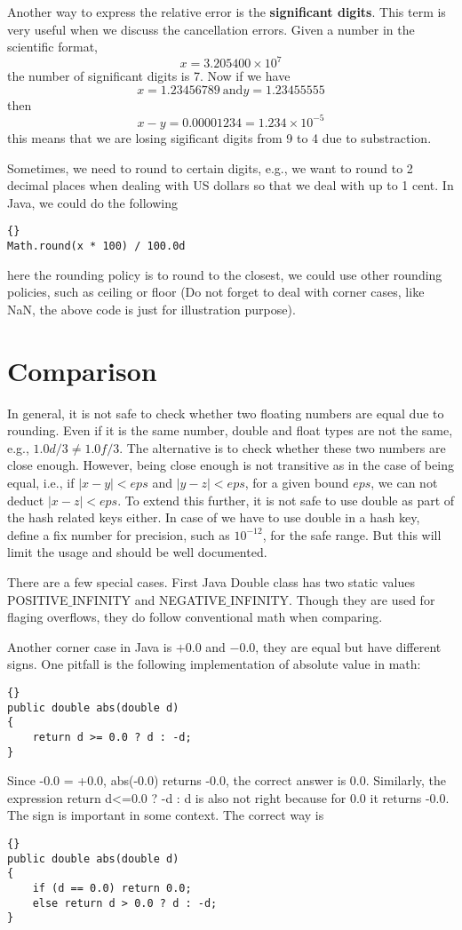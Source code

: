 Another way to express the relative error is the \textbf{significant digits}. This term is very useful when we discuss the cancellation errors. Given a number in the scientific format,
\[ x = 3.205400 \times 10^7 \]
the number of significant digits is 7. Now if we have
\[ x = 1.23456789 \ \text{and} y = 1.23455555\]
then
\[ x - y = 0.00001234 = 1.234 \times 10^{-5} \]
this means that we are losing sigificant digits from 9 to 4 due to substraction. 

Sometimes, we need to round to certain digits, e.g., we want to round to 2 decimal places when dealing with US dollars so that we deal with up to 1 cent.
In Java, we could do the following
\begin{lstlisting}[frame=trbl]{}
Math.round(x * 100) / 100.0d
\end{lstlisting}
here the rounding policy is to round to the closest, we could use other rounding policies, such as ceiling or floor (Do not forget to deal with corner cases, like NaN, the above code is just for illustration purpose).

\section{Comparison}
In general, it is not safe to check whether two floating numbers are equal due to rounding. Even if it is the same number, double and float types are not the same, e.g., $1.0d/3 \neq 1.0f/3$. The alternative is to check whether these two numbers are close enough. However, being close enough is not transitive as in the case of being equal, i.e., if $|x - y| < eps$ and $|y - z| < eps$, for a given bound $eps$, we can not deduct $|x - z| < eps$. To extend this further, it is not safe to use double as part of the hash related keys either. In case of we have to use double in a hash key, define a fix number for precision, such as $10^{-12}$, for the safe range. But this will limit the usage and should be well documented.

There are a few special cases. First Java Double class has two static values POSITIVE$\_$INFINITY and NEGATIVE$\_$INFINITY. Though they are used for flaging overflows, they do follow conventional math when comparing.

Another corner case in Java is $+0.0$ and $-0.0$, they are equal but have different signs. One pitfall is the following implementation of absolute value in math:
\begin{lstlisting}[frame=trbl]{}
public double abs(double d)
{
    return d >= 0.0 ? d : -d;
}
\end{lstlisting}
Since -0.0 = +0.0, abs(-0.0) returns -0.0, the correct answer is 0.0. Similarly, the expression return d<=0.0 ? -d : d is also not right because for 0.0 it returns -0.0. The sign is important in some context. The correct way is
\begin{lstlisting}[frame=trbl]{}
public double abs(double d)
{
    if (d == 0.0) return 0.0;
    else return d > 0.0 ? d : -d;
}
\end{lstlisting}

